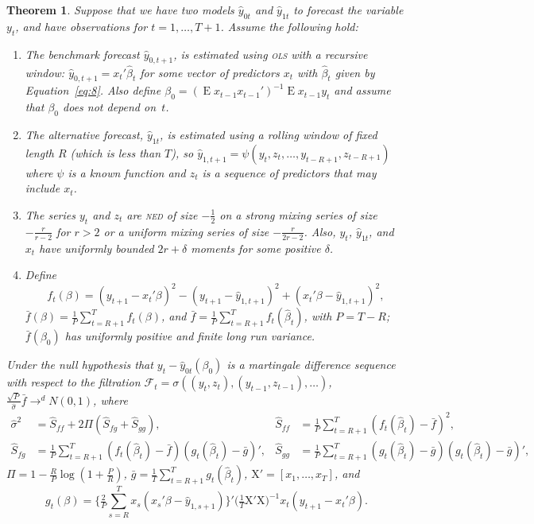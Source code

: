 \documentclass[11pt,fleqn]{article}
\newtheorem{thm}{Theorem}
\theoremstyle{definition}
\DeclareMathOperator{\E}{E}
\newcommand{\X}{\ensuremath{\mathrm{X}}}
\newcommand{\ned}{\textsc{ned}}
\newcommand{\ols}{\textsc{ols}}
\begin{document}
\begin{thm}\label{res:1}
  Suppose that we have two models $\hat{y}_{0t}$ and $\hat{y}_{1t}$ to
  forecast the variable $y_t$, and have observations for
  $t=1,\dots,T+1$.  Assume the following hold:
  \begin{enumerate}
  \item \label{item:1} The benchmark forecast $\hat{y}_{0,t+1}$, is
    estimated using \textsl{\ols} with a recursive window:
    $\hat{y}_{0,t+1} = x_t'\hat{\beta}_t$ for some vector of
    predictors $x_t$ with $\hat{\beta}_t$ given by
    Equation~\eqref{eq:8}.  Also define $\beta_0 = (\E x_{t-1}
    x_{t-1}')^{-1} \E x_{t-1} y_t$ and assume that $\beta_0$ does not depend
    on~$t$.
  \item \label{item:2} The alternative forecast, $\hat{y}_{1t}$, is
    estimated using a rolling window of fixed length $R$ (which is
    less than $T$), so $\hat{y}_{1,t+1} =
    \psi(y_t,z_t,\dots,y_{t-R+1}, z_{t-R+1})$ where $\psi$ is a known
    function and $z_t$ is a sequence of predictors that may include
    $x_t$.
  \item \label{item:3} The series $y_t$ and $z_t$ are \textsl{\ned} of size
    $-\frac12$ on a strong mixing series of size $-\frac{r}{r-2}$ for $r>2$ or a
    uniform mixing series of size $-\frac{r}{2r-2}$.  Also, $y_t$,
    $\hat{y}_{1t}$, and $x_t$ have uniformly bounded $2 r+\delta$
    moments for some positive $\delta$.
  \item \label{item:4} Define \[f_t(\beta) = (y_{t+1} - x_t'\beta)^2 -
    (y_{t+1} - \hat{y}_{1,t+1})^2 + (x_t'\beta - \hat{y}_{1,t+1})^2,\]
    $\bar{f}(\beta) = \tfrac1P \sum_{t=R+1}^T f_t(\beta)$, and $\bar f
    = \tfrac1P \sum_{t=R+1}^{T} f_t(\hat{\beta}_t)$, with $P = T - R$;
    $\bar f(\beta_0)$ has uniformly positive and finite long run
    variance.
  \end{enumerate}
  Under the null hypothesis that $y_t - \hat{y}_{0t}(\beta_0)$ is a
  martingale difference sequence with respect to the filtration
  $\mathcal{F}_t = \sigma((y_t, z_{t}), (y_{t-1}, z_{t-1}),\dots)$,
  $\tfrac{\sqrt{P}}{\hat\sigma} \bar f \to^d N(0,1)$, where 
  \begin{align*}
    \hat{\sigma}^2 &= \hat{S}_{ff} + 2 \Pi (\hat{S}_{fg} + \hat{S}_{gg}), &
    \hat{S}_{ff} &= \tfrac1P \sum_{t=R+1}^T (f_t(\hat{\beta}_t) - \bar
    f)^2, \\
    \hat{S}_{fg} &= \tfrac1P \sum_{t=R+1}^T (f_t(\hat{\beta}_t) -
    \bar{f})(g_t(\hat{\beta}_t) - \bar g)', &
    \hat{S}_{gg} &= \tfrac1P \sum_{t=R+1}^T (g_t(\hat{\beta}_t) - \bar
    g)(g_t(\hat{\beta}_t) - \bar g)',
  \end{align*}
  $\Pi = 1 - \tfrac{R}{P} \log(1 + \tfrac{P}{R})$, $\bar{g} = \tfrac1T
  \sum_{t=R+1}^T g_t(\hat{\beta}_t)$, $\X' = [x_1,\dots,x_T]$, and
  \begin{equation*}
    g_t(\beta) =
    \Big\{\tfrac{2}{P}\sum_{s=R}^T x_s (x_s'\beta - \hat{y}_{1,s+1}) \Big\}'
    \big(\tfrac1T \X'\X \big)^{-1} x_t(y_{t+1} - x_t'\beta).
  \end{equation*}
\end{thm}
\end{document}
